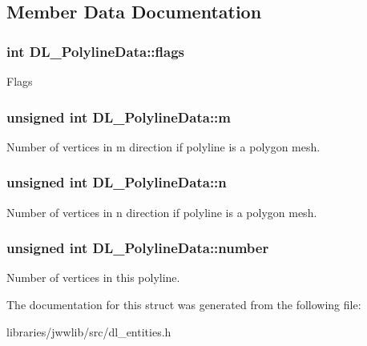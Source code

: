 \subsection{Member Data Documentation}
\hypertarget{structDL__PolylineData_ab96f90f41192bf3345cf2f84c32d293f}{
\subsubsection[{flags}]{\setlength{\rightskip}{0pt plus 5cm}int D\-L\-\_\-\-Polyline\-Data\-::flags}}\label{structDL__PolylineData_ab96f90f41192bf3345cf2f84c32d293f}
Flags \hypertarget{structDL__PolylineData_a59523f90d2e8fede866879e596323208}{
\subsubsection[{m}]{\setlength{\rightskip}{0pt plus 5cm}unsigned int D\-L\-\_\-\-Polyline\-Data\-::m}}\label{structDL__PolylineData_a59523f90d2e8fede866879e596323208}
Number of vertices in m direction if polyline is a polygon mesh. \hypertarget{structDL__PolylineData_a60a2b0e033690202cf9faec4a4a4afed}{
\subsubsection[{n}]{\setlength{\rightskip}{0pt plus 5cm}unsigned int D\-L\-\_\-\-Polyline\-Data\-::n}}\label{structDL__PolylineData_a60a2b0e033690202cf9faec4a4a4afed}
Number of vertices in n direction if polyline is a polygon mesh. \hypertarget{structDL__PolylineData_a20bcf0ca806c2fa8b8e1f96f6d0c36ee}{
\subsubsection[{number}]{\setlength{\rightskip}{0pt plus 5cm}unsigned int D\-L\-\_\-\-Polyline\-Data\-::number}}\label{structDL__PolylineData_a20bcf0ca806c2fa8b8e1f96f6d0c36ee}
Number of vertices in this polyline. 

The documentation for this struct was generated from the following file\-:\begin{DoxyCompactItemize}
\item 
libraries/jwwlib/src/dl\-\_\-entities.\-h\end{DoxyCompactItemize}
